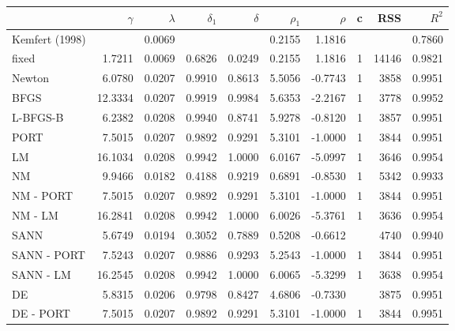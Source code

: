 \begin{tabular}{lrrrrrrrrr}
  \hline
 & $\gamma$ & $\lambda$ & $\delta_1$ & $\delta$ & $\rho_1$ & $\rho$ & c & RSS & $R^2$ \\ 
  \hline
Kemfert (1998) &  & 0.0069 &  &  & 0.2155 & 1.1816 &  &  & 0.7860 \\ 
  fixed & 1.7211 & 0.0069 & 0.6826 & 0.0249 & 0.2155 & 1.1816 & 1 & 14146 & 0.9821 \\ 
  Newton & 6.0780 & 0.0207 & 0.9910 & 0.8613 & 5.5056 & -0.7743 & 1 & 3858 & 0.9951 \\ 
  \color{red} BFGS & \color{red} 12.3334 & \color{red} 0.0207 & \color{red} 0.9919 & \color{red} 0.9984 & \color{red} 5.6353 & \color{red} -2.2167 & \color{red} 1 & \color{red} 3778 & \color{red} 0.9952 \\ 
  L-BFGS-B & 6.2382 & 0.0208 & 0.9940 & 0.8741 & 5.9278 & -0.8120 & 1 & 3857 & 0.9951 \\ 
  PORT & 7.5015 & 0.0207 & 0.9892 & 0.9291 & 5.3101 & -1.0000 & 1 & 3844 & 0.9951 \\ 
  \color{red} LM & \color{red} 16.1034 & \color{red} 0.0208 & \color{red} 0.9942 & \color{red} 1.0000 & \color{red} 6.0167 & \color{red} -5.0997 & \color{red} 1 & \color{red} 3646 & \color{red} 0.9954 \\ 
  NM & 9.9466 & 0.0182 & 0.4188 & 0.9219 & 0.6891 & -0.8530 & 1 & 5342 & 0.9933 \\ 
  NM - PORT & 7.5015 & 0.0207 & 0.9892 & 0.9291 & 5.3101 & -1.0000 & 1 & 3844 & 0.9951 \\ 
  \color{red} NM - LM & \color{red} 16.2841 & \color{red} 0.0208 & \color{red} 0.9942 & \color{red} 1.0000 & \color{red} 6.0026 & \color{red} -5.3761 & \color{red} 1 & \color{red} 3636 & \color{red} 0.9954 \\ 
  SANN & 5.6749 & 0.0194 & 0.3052 & 0.7889 & 0.5208 & -0.6612 &  & 4740 & 0.9940 \\ 
  SANN - PORT & 7.5243 & 0.0207 & 0.9886 & 0.9293 & 5.2543 & -1.0000 & 1 & 3844 & 0.9951 \\ 
  \color{red} SANN - LM & \color{red} 16.2545 & \color{red} 0.0208 & \color{red} 0.9942 & \color{red} 1.0000 & \color{red} 6.0065 & \color{red} -5.3299 & \color{red} 1 & \color{red} 3638 & \color{red} 0.9954 \\ 
  DE & 5.8315 & 0.0206 & 0.9798 & 0.8427 & 4.6806 & -0.7330 &  & 3875 & 0.9951 \\ 
  DE - PORT & 7.5015 & 0.0207 & 0.9892 & 0.9291 & 5.3101 & -1.0000 & 1 & 3844 & 0.9951 \\ 

\end{tabular}
